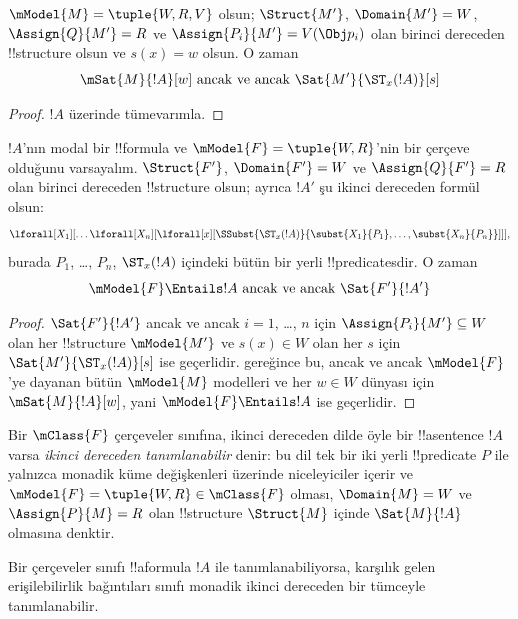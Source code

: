 \documentclass[../../../include/open-logic-section]{subfiles}
\begin{document}
\begin{prop}
  $\mModel{M}=\tuple{W,R,V}$ olsun; $\Struct{M'}$, $\Domain{M'}=W$,
  $\Assign{Q}{M'}=R$ ve $\Assign{P_i}{M'}=V(\Obj p_i)$ olan birinci
  dereceden !!{structure} olsun ve $s(x)=w$ olsun. O zaman
  \[
  \mSat{M}{!A}[w] \text{ ancak ve ancak } \Sat{M'}{\ST_x(!A)}[s]
  \]
\end{prop}

\begin{proof}
  $!A$ üzerinde tümevarımla.
\end{proof}

\begin{prop}
  $!A$'nın modal bir !!{formula} ve
  $\mModel{F}=\tuple{W,R}$'nin bir çerçeve olduğunu varsayalım.
  $\Struct{F'}$, $\Domain{F'}=W$ ve $\Assign{Q}{F'}=R$ olan birinci
  dereceden !!{structure} olsun; ayrıca $!A'$ şu ikinci dereceden formül
  olsun:
  \[
  \lforall[X_1][\dots\lforall[X_n][\lforall[x][
        \SSubst{\ST_x(!A)}{\subst{X_1}{P_1}, \dots,
          \subst{X_n}{P_n}}]]],
  \]
  burada $P_1$, \dots, $P_n$, $\ST_x(!A)$ içindeki bütün bir yerli
  !!{predicate}s{}dir. O zaman
  \[
  \mModel{F} \Entails !A \text{ ancak ve ancak } \Sat{F'}{!A'}
  \]
\end{prop}

\begin{proof}
  $\Sat{F'}{!A'}$ ancak ve ancak $i=1$, \dots, $n$ için
  $\Assign{P_i}{M'}\subseteq W$ olan her !!{structure} $\mModel{M'}$ ve
  $s(x)\in W$ olan her $s$ için $\Sat{M'}{\ST_x(!A)}[s]$ ise geçerlidir.
   gereğince bu, ancak ve ancak $\mModel{F}$'ye dayanan bütün
  $\mModel{M}$ modelleri ve her $w\in W$ dünyası için
  $\mSat{M}{!A}[w]$, yani $\mModel{F}\Entails !A$ ise geçerlidir.
\end{proof}

\begin{defn}
  Bir $\mClass{F}$ çerçeveler sınıfına, ikinci dereceden dilde öyle bir
  !!a{sentence} $!A$ varsa \emph{ikinci dereceden tanımlanabilir} denir:
  bu dil tek bir iki yerli !!{predicate} $P$ ile yalnızca monadik küme
  değişkenleri üzerinde niceleyiciler içerir ve
  $\mModel{F}=\tuple{W,R}\in\mClass{F}$ olması, $\Domain{M}=W$ ve
  $\Assign{P}{M}=R$ olan !!{structure} $\Struct{M}$ içinde
  $\Sat{M}{!A}$ olmasına denktir.
\end{defn}

\begin{cor}
  Bir çerçeveler sınıfı !!a{formula} $!A$ ile tanımlanabiliyorsa, karşılık
  gelen erişilebilirlik bağıntıları sınıfı monadik ikinci dereceden bir
  tümceyle tanımlanabilir.
\end{cor}
\end{document}
